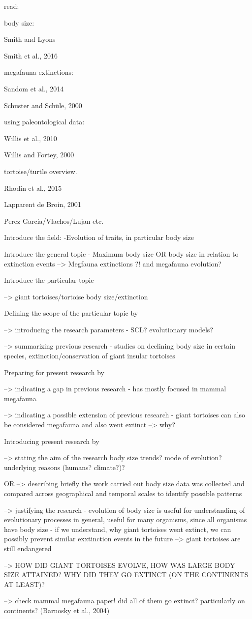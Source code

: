 read:

body size:

Smith and Lyons

Smith et al., 2016

megafauna extinctions:

Sandom et al., 2014

Schuster and Schüle, 2000

using paleontological data:

Willis et al., 2010

Willis and Fortey, 2000

tortoise/turtle overview.

Rhodin et al., 2015

Lapparent de Broin, 2001

Perez-Garcia/Vlachos/Lujan etc.


Introduce the field:
-Evolution of traits, in particular body size

Introduce the general topic
- Maximum body size OR body size in relation to extinction events
--> Megfauna extinctions ?! and megafauna evolution?

Introduce the particular topic

--> giant tortoises/tortoise body size/extinction

Defining the scope of the particular topic by

--> introducing the research parameters
- SCL? evolutionary models?

--> summarizing previous research
- studies on declining body size in certain species, extinction/conservation of giant insular tortoises

Preparing for present research by

--> indicating a gap in previous research
- has mostly focused in mammal megafauna

--> indicating a possible extension of previous research
- giant tortoises can also be considered megafauna and also went extinct --> why?

Introducing present research by

--> stating the aim of the research
body size trends? mode of evolution? underlying reasons (humans? climate?)?

OR 
--> describing briefly the work carried out
body size data was collected and compared across geographical and temporal scales to identify possible patterns

--> justifying the research
- evolution of body size is useful for understanding of evolutionary processes in general, useful for many organisms, since all organisms have body size
- if we understand, why giant tortoises went extinct, we can possibly prevent similar exxtinction events in the future --> giant tortoises are still endangered


--> HOW DID GIANT TORTOISES EVOLVE, HOW WAS LARGE BODY SIZE ATTAINED? WHY DID THEY GO EXTINCT (ON THE CONTINENTS AT LEAST)?


--> check mammal megafauna paper! did all of them go extinct? particularly on continents? (Barnosky et al., 2004)
